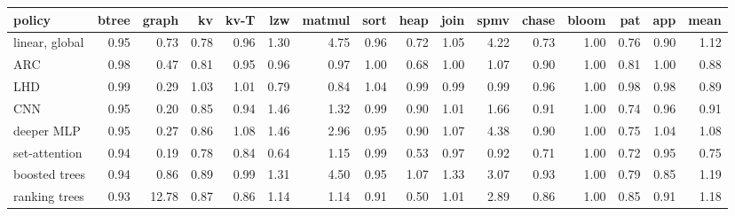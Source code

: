 \begin{tabular}{lrrrrrrrrrrrrrrr}
\toprule
policy & btree & graph & kv & kv-T & lzw & matmul & sort & heap & join & spmv & chase & bloom & pat & app & mean \\
\midrule
linear, global & 0.95 & 0.73 & 0.78 & 0.96 & 1.30 & 4.75 & 0.96 & 0.72 & 1.05 & 4.22 & 0.73 & 1.00 & 0.76 & 0.90 & 1.12 \\
ARC & 0.98 & 0.47 & 0.81 & 0.95 & 0.96 & 0.97 & 1.00 & 0.68 & 1.00 & 1.07 & 0.90 & 1.00 & 0.81 & 1.00 & 0.88 \\
LHD & 0.99 & 0.29 & 1.03 & 1.01 & 0.79 & 0.84 & 1.04 & 0.99 & 0.99 & 0.99 & 0.96 & 1.00 & 0.98 & 0.98 & 0.89 \\
CNN & 0.95 & 0.20 & 0.85 & 0.94 & 1.46 & 1.32 & 0.99 & 0.90 & 1.01 & 1.66 & 0.91 & 1.00 & 0.74 & 0.96 & 0.91 \\
deeper MLP & 0.95 & 0.27 & 0.86 & 1.08 & 1.46 & 2.96 & 0.95 & 0.90 & 1.07 & 4.38 & 0.90 & 1.00 & 0.75 & 1.04 & 1.08 \\
set-attention & 0.94 & 0.19 & 0.78 & 0.84 & 0.64 & 1.15 & 0.99 & 0.53 & 0.97 & 0.92 & 0.71 & 1.00 & 0.72 & 0.95 & 0.75 \\
boosted trees & 0.94 & 0.86 & 0.89 & 0.99 & 1.31 & 4.50 & 0.95 & 1.07 & 1.33 & 3.07 & 0.93 & 1.00 & 0.79 & 0.85 & 1.19 \\
ranking trees & 0.93 & 12.78 & 0.87 & 0.86 & 1.14 & 1.14 & 0.91 & 0.50 & 1.01 & 2.89 & 0.86 & 1.00 & 0.85 & 0.91 & 1.18 \\
\bottomrule
\end{tabular}
